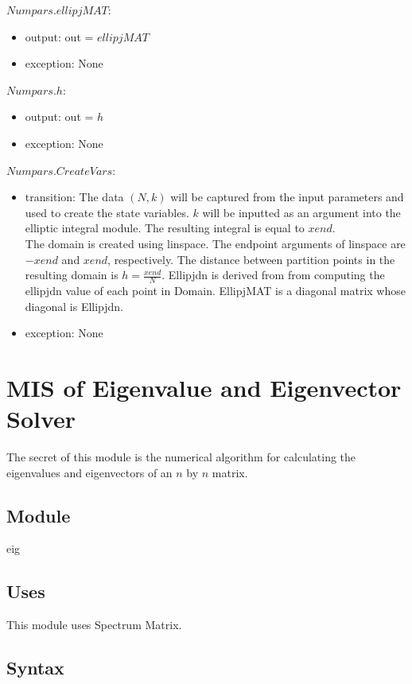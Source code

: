 \documentclass[12pt, titlepage]{article}
\begin{document}
\noindent $Numpars.ellipjMAT$:
\begin{itemize}
	\item output: out = $ellipjMAT$
	\item exception: None
\end{itemize}

\noindent $Numpars.h$:
\begin{itemize}
	\item output: out = $h$ 
	\item exception: None
\end{itemize} 

\noindent $Numpars.CreateVars$:
\begin{itemize}
	\item transition: The data $(N,k)$ will be captured from the input 
	parameters and used to create the state variables. $k$ will be inputted as 
	an argument into the elliptic integral module. The resulting integral is 
	equal to $xend$. \\ 
	The domain is created using linspace. The endpoint arguments of linspace 
	are $-xend$ and $xend$, respectively. The distance between partition points 
	in the resulting domain is $h=\frac{xend}{N}$. Ellipjdn is derived from 
	from computing the ellipjdn value of each point in Domain. EllipjMAT is a 
	diagonal matrix whose diagonal is Ellipjdn. 
	\item exception: None
\end{itemize}

\newpage

\section{MIS of Eigenvalue and Eigenvector Solver} 

The secret of this module is the numerical algorithm for calculating the 
eigenvalues and eigenvectors of an $n$ by $n$ matrix.

\subsection{Module}

eig

\subsection{Uses}

This module uses Spectrum Matrix. 

\subsection{Syntax}
\end{document}
